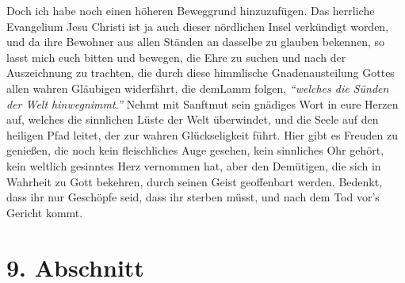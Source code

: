 Doch ich habe noch einen höheren Beweggrund hinzuzufügen. Das herrliche
Evangelium Jesu Christi ist ja auch dieser nördlichen Insel verkündigt
worden, und da ihre Bewohner aus allen Ständen an dasselbe zu glauben bekennen,
so lasst mich euch bitten und bewegen, die Ehre zu suchen und nach der
Auszeichnung zu trachten, die durch diese himmlische
Gnadenausteilung Gottes
allen wahren Gläubigen widerfährt, die demLamm folgen,
\textit{"`welches die Sünden
der Welt hinwegnimmt."'}
Nehmt mit Sanftmut sein gnädiges
Wort in eure Herzen auf, welches die sinnlichen Lüste der Welt
überwindet, und
die Seele auf den heiligen Pfad leitet, der zur wahren Glückseligkeit führt.
Hier gibt es Freuden zu genießen, die noch kein fleischliches Auge gesehen,
kein sinnliches Ohr gehört, kein weltlich gesinntes Herz vernommen hat, aber den
Demütigen, die sich in Wahrheit zu Gott bekehren, durch seinen Geist
geoffenbart werden. Bedenkt, dass ihr nur Geschöpfe seid, dass ihr sterben
müsst,
und nach dem Tod vor's Gericht kommt. 

\section{9. Abschnitt} \label{kap11_ab9}

